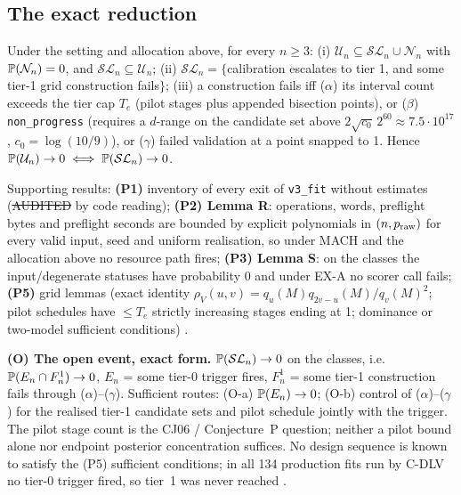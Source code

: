 \subsection{The exact reduction}
\begin{theorem}[D; C-DLV]\label{thm:D}
Under the setting and allocation above, for every $n\ge3$: (i) $\mathcal U_n\subseteq\mathcal{SL}_n\cup\mathcal N_n$ with $\mathbb P(\mathcal N_n)=0$, and $\mathcal{SL}_n\subseteq\mathcal U_n$; (ii) $\mathcal{SL}_n=\{$calibration escalates to tier 1, and some tier-1 grid construction fails$\}$; (iii) a construction fails iff ($\alpha$) its interval count exceeds the tier cap $T_e$ (pilot stages plus appended bisection points), or ($\beta$) \texttt{non\_progress} (requires a $d$-range on the candidate set above $2\sqrt{c_0}\,2^{60}\approx7.5\cdot10^{17}$, $c_0=\log(10/9)$), or ($\gamma$) failed validation at a point snapped to 1. Hence $\mathbb P(\mathcal U_n)\to0\iff\mathbb P(\mathcal{SL}_n)\to0$.
\end{theorem}
Supporting results: \textbf{(P1)} inventory of every exit of \texttt{v3\_fit} without estimates (\st{AUDITED} by code reading); \textbf{(P2) Lemma R}: operations, words, preflight bytes and preflight seconds are bounded by explicit polynomials in $(n,p_{\rm raw})$ for every valid input, seed and uniform realisation, so under MACH and the allocation above no resource path fires; \textbf{(P3) Lemma S}: on the classes the input/degenerate statuses have probability 0 and under EX-A no scorer call fails; \textbf{(P5)} grid lemmas (exact identity $\rho_V(u,v)=q_u(M)q_{2v-u}(M)/q_v(M)^2$; pilot schedules have $\le T_e$ strictly increasing stages ending at 1; dominance or two-model sufficient conditions) .

\textbf{(O) The open event, exact form.} $\mathbb P(\mathcal{SL}_n)\to0$ on the classes, i.e.\ $\mathbb P(E_n\cap F^1_n)\to0$, $E_n$ = some tier-0 trigger fires, $F^1_n$ = some tier-1 construction fails through ($\alpha$)--($\gamma$). Sufficient routes: (O-a) $\mathbb P(E_n)\to0$; (O-b) control of ($\alpha$)--($\gamma$) for the realised tier-1 candidate sets and pilot schedule jointly with the trigger. The pilot stage count is the CJ06 / Conjecture~P question; neither a pilot bound alone nor endpoint posterior concentration suffices. No design sequence is known to satisfy the (P5) sufficient conditions; in all 134 production fits run by C-DLV no tier-0 trigger fired, so tier~1 was never reached .

